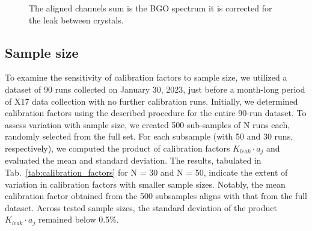\begin{refsection}
    \begin{figure}[]
        \centering
        \caption[BGO: introducing the leak]{The aligned channels sum is the BGO spectrum it is corrected for the leak between crystals.}
        \label{fig:BGO:leak}
    \end{figure}

    \subsection{Sample size}
        To examine the sensitivity of calibration factors to sample size, we utilized a dataset of 90 runs collected on January 30, 2023, just before a month-long period of X17 data collection with no further calibration runs. 
        Initially, we determined calibration factors using the described procedure for the entire 90-run dataset.
        To assess variation with sample size, we created 500 sub-samples of N runs each, randomly selected from the full set. 
        For each subsample (with 50 and 30 runs, respectively), we computed the product of calibration factors $K_{leak} \cdot a_j$ and evaluated the mean and standard deviation. 
        The results, tabulated in Tab.~\ref{tab:calibration_factors} for N = 30 and N = 50, indicate the extent of variation in calibration factors with smaller sample sizes. 
        Notably, the mean calibration factor obtained from the 500 subsamples aligns with that from the full dataset. 
        Across tested sample sizes, the standard deviation of the product $K_{leak} \cdot a_j$ remained below 0.5\%.
        

\end{refsection}
